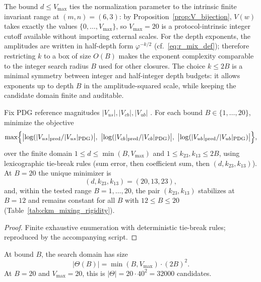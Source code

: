 \begin{remark}\label{rem:ckm_bounds_rationale}
The bound $d\le V_{\max}$ ties the normalization parameter to the intrinsic finite invariant range at $(m,n)=(6,3)$: by Proposition~\ref{prop:V_bijection}, $V(w)$ takes exactly the values $\{0,\dots,V_{\max}\}$, so $V_{\max}=20$ is a protocol-intrinsic integer cutoff available without importing external scales.
For the depth exponents, the amplitudes are written in half-depth form $\varphi^{-k/2}$ (cf.\ \eqref{eq:r_mix_def}); therefore restricting $k$ to a box of size $O(B)$ makes the exponent complexity comparable to the integer search radius $B$ used for other closures.
The choice $k\le 2B$ is a minimal symmetry between integer and half-integer depth budgets: it allows exponents up to depth $B$ in the amplitude-squared scale, while keeping the candidate domain finite and auditable.
\end{remark}

\begin{proposition}\label{prop:ckm_mixing_rigidity}
Fix PDG reference magnitudes $|V_{us}|,|V_{cb}|,|V_{ub}|$ \cite{PDGRPP2024}.
For each bound $B\in\{1,\dots,20\}$, minimize the objective
\[
\max\Bigl\{\bigl|\log(|V_{us}|_{\mathrm{pred}}/|V_{us}|_{\mathrm{PDG}})\bigr|,
\ \bigl|\log(|V_{cb}|_{\mathrm{pred}}/|V_{cb}|_{\mathrm{PDG}})\bigr|,
\ \bigl|\log(|V_{ub}|_{\mathrm{pred}}/|V_{ub}|_{\mathrm{PDG}})\bigr|\Bigr\},
\]
over the finite domain $1\le d\le \min(B,V_{\max})$ and $1\le k_{23},k_{13}\le 2B$, using lexicographic tie-break rules (sum error, then coefficient sum, then $(d,k_{23},k_{13})$).
At $B=20$ the unique minimizer is
\[
(d,k_{23},k_{13})=(20,13,23),
\]
and, within the tested range $B=1,\dots,20$, the pair $(k_{23},k_{13})$ stabilizes at $B=12$ and remains constant for all $B$ with $12\le B\le 20$ (Table~\ref{tab:ckm_mixing_rigidity}).
\end{proposition}
\begin{proof}
Finite exhaustive enumeration with deterministic tie-break rules; reproduced by the accompanying script.
\end{proof}

\begin{remark}\label{rem:ckm_domain_size}
At bound $B$, the search domain has size
\[
|\Theta(B)|=\min(B,V_{\max})\cdot (2B)^2.
\]
At $B=20$ and $V_{\max}=20$, this is $|\Theta|=20\cdot 40^2=32000$ candidates.
\end{remark}

